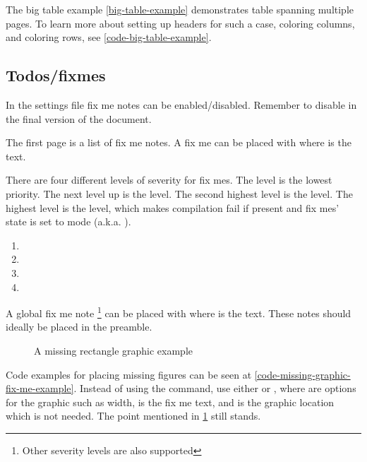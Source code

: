 The big table example \cref{big-table-example} demonstrates table spanning multiple pages.
To learn more about setting up headers for such a case, coloring columns, and coloring rows,
see \cref{code-big-table-example}.


\subsection{Todos/fixmes}
\label{fixmes-section}
In the settings file  fix me notes can be enabled/disabled.
Remember to disable in the final version of the document.

The first page is a list of fix me notes. 
A fix me can be placed
with  where  is the text.

There are four different levels of severity for fix mes.
The  level is the lowest priority.
The next level up is the  level.
The second highest level is the  level.
The highest level is the  level, 
which makes compilation fail if present
and fix mes' state is set to  mode (a.k.a. ).

\begin{enumerate}
    \item {}
    \item {}
    \item {}
    \item {}
\end{enumerate}

A global fix me note%
\footnote{\label{all-severity-levels-supported}Other severity levels are also supported}
can be placed with 
 where  is the text.
These notes should ideally be placed in the preamble.

\begin{figure}
    \centering
    
    \caption{A missing rectangle graphic example}
\end{figure}

Code examples for placing missing figures can be seen at
\cref{code-missing-graphic-fix-me-example}.
Instead of using the 
command, use either 
or ,
where  are options for the graphic such as width,
 is the fix me text,
and  is the graphic location which is not needed.
The point mentioned in \cref{all-severity-levels-supported} still stands.

